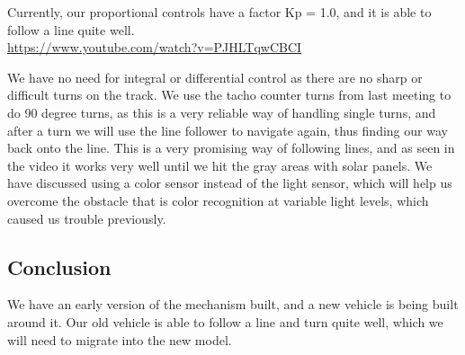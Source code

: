 Currently, our proportional controls have a factor Kp = 1.0, and it is
able to follow a line quite
well.\\\url{https://www.youtube.com/watch?v=PJHLTqwCBCI}

We have no need for integral or differential control as there are no
sharp or difficult turns on the track. We use the tacho counter turns
from last meeting to do 90 degree turns, as this is a very reliable way
of handling single turns, and after a turn we will use the line follower
to navigate again, thus finding our way back onto the line. This is a
very promising way of following lines, and as seen in the video it works
very well until we hit the gray areas with solar panels. We have discussed
using a color sensor instead of the light sensor, which will help us
overcome the obstacle that is color recognition at variable light
levels, which caused us trouble previously.

\subsection{Conclusion}

We have an early version of the mechanism built, and a new vehicle is
being built around it. Our old vehicle is able to follow a line and turn
quite well, which we will need to migrate into the new model.
